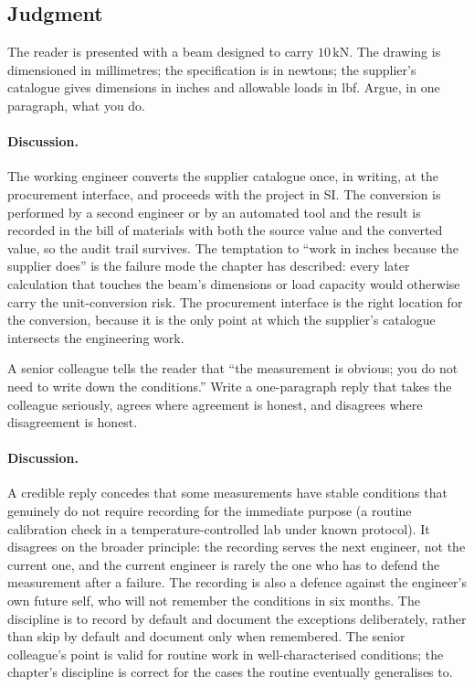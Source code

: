 \subsection*{Judgment}

\begin{exercise}
The reader is presented with a beam designed to carry $10 \,\si{\kilo
\newton}$. The drawing is dimensioned in millimetres; the
specification is in newtons; the supplier's catalogue gives
dimensions in inches and allowable loads in lbf. Argue, in one
paragraph, what you do.

\paragraph{Discussion.} The working engineer converts the supplier
catalogue once, in writing, at the procurement interface, and
proceeds with the project in SI. The conversion is performed by a
second engineer or by an automated tool and the result is recorded
in the bill of materials with both the source value and the
converted value, so the audit trail survives. The temptation to
``work in inches because the supplier does'' is the failure mode
the chapter has described: every later calculation that touches
the beam's dimensions or load capacity would otherwise carry the
unit-conversion risk. The procurement interface is the right
location for the conversion, because it is the only point at which
the supplier's catalogue intersects the engineering work.
\end{exercise}

\begin{exercise}
A senior colleague tells the reader that ``the measurement is
obvious; you do not need to write down the conditions.'' Write a
one-paragraph reply that takes the colleague seriously, agrees where
agreement is honest, and disagrees where disagreement is honest.

\paragraph{Discussion.} A credible reply concedes that some
measurements have stable conditions that genuinely do not require
recording for the immediate purpose (a routine calibration check
in a temperature-controlled lab under known protocol). It
disagrees on the broader principle: the recording serves the next
engineer, not the current one, and the current engineer is rarely
the one who has to defend the measurement after a failure. The
recording is also a defence against the engineer's own future
self, who will not remember the conditions in six months. The
discipline is to record by default and document the exceptions
deliberately, rather than skip by default and document only when
remembered. The senior colleague's point is valid for routine work
in well-characterised conditions; the chapter's discipline is
correct for the cases the routine eventually generalises to.
\end{exercise}

